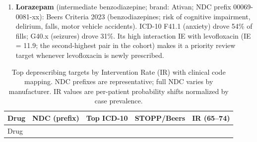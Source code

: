 \documentclass[
  12pt,
]{book}
\begin{document}
\begin{enumerate}
  discretionary at the point of care (it can often be substituted with
  amoxicillin/clavulanate for non-severe community-acquired pneumonia in
  the absence of penicillin allergy).
\item
  \textbf{Lorazepam} (intermediate benzodiazepine; brand: Ativan; NDC
  prefix 00069-0081-xx): Beers Criteria 2023 (benzodiazepines; risk of
  cognitive impairment, delirium, falls, motor vehicle accidents).
  ICD-10 F41.1 (anxiety) drove 54\% of fills; G40.x (seizures) drove
  31\%. Its high interaction IE with levofloxacin (IE = 11.9; the
  second-highest pair in the cohort) makes it a priority review target
  whenever levofloxacin is newly prescribed.
\end{enumerate}

\begin{longtable}[]{@{}
  >{\raggedright\arraybackslash}p{}
  >{\raggedright\arraybackslash}p{}
  >{\raggedright\arraybackslash}p{}
  >{\raggedright\arraybackslash}p{}
  >{\raggedleft\arraybackslash}p{}@{}}
\caption{Top deprescribing targets by Intervention Rate (IR) with
clinical code mapping. NDC prefixes are representative; full NDC varies
by manufacturer. IR values are per-patient probability shifts normalized
by case prevalence.}\label{tbl-ir}\tabularnewline
\toprule\noalign{}
\begin{minipage}[b]{\linewidth}\raggedright
Drug
\end{minipage} & \begin{minipage}[b]{\linewidth}\raggedright
NDC (prefix)
\end{minipage} & \begin{minipage}[b]{\linewidth}\raggedright
Top ICD-10
\end{minipage} & \begin{minipage}[b]{\linewidth}\raggedright
STOPP/Beers
\end{minipage} & \begin{minipage}[b]{\linewidth}\raggedleft
IR (65--74)
\end{minipage} \\
\midrule\noalign{}
\endfirsthead
\toprule\noalign{}
\begin{minipage}[b]{\linewidth}\raggedright
Drug
\end{minipage} & \begin{minipage}[b]{\linewidth}\raggedright

\end{minipage}
\end{longtable}
\end{document}
